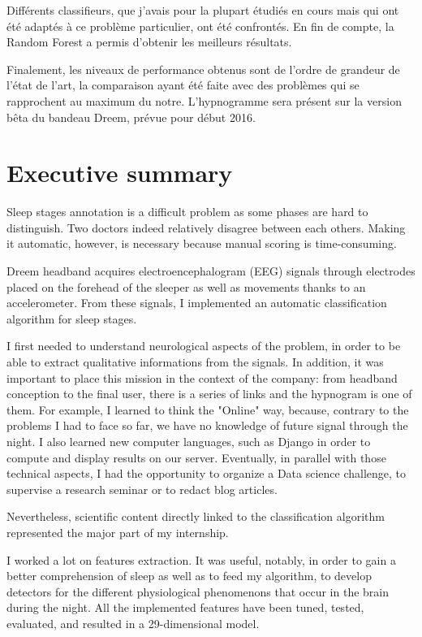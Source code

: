 \documentclass[12pt]{report}
\begin{document}
Différents classifieurs, que j'avais pour la plupart étudiés en cours mais qui ont été adaptés à ce problème particulier, ont été confrontés. En fin de compte, la Random Forest a permis d'obtenir les meilleurs résultats.

Finalement, les niveaux de performance obtenus sont de l'ordre de grandeur de l'état de l'art, la comparaison ayant été faite avec des problèmes qui se rapprochent au maximum du notre. L'hypnogramme sera présent sur la version bêta du bandeau Dreem, prévue pour début 2016.

\newpage
\section*{Executive summary}

Sleep stages annotation is a difficult problem as some phases are hard to distinguish. Two doctors indeed relatively disagree between each others. Making it automatic, however, is necessary because manual scoring is time-consuming.

Dreem headband acquires electroencephalogram (EEG) signals through electrodes placed on the forehead of the sleeper as well as movements thanks to an accelerometer. From these signals, I implemented an automatic classification algorithm for sleep stages.

I first needed to understand neurological aspects of the problem, in order to be able to extract qualitative informations from the signals. In addition, it was important to place this mission in the context of the company: from headband conception to the final user, there is a series of links and the hypnogram is one of them. For example, I learned to think the "Online" way, because, contrary to the problems I had to face so far, we have no knowledge of future signal through the night. I also learned new computer languages, such as Django in order to compute and display results on our server. Eventually, in parallel with those technical aspects, I had the opportunity to organize a Data science challenge, to supervise a research seminar or to redact blog articles.

Nevertheless, scientific content directly linked to the classification algorithm represented the major part of my internship.

I worked a lot on features extraction. It was useful, notably, in order to gain a better comprehension of sleep as well as to feed my algorithm, to develop detectors for the different physiological phenomenons that occur in the brain during the night. All the implemented features have been tuned, tested, evaluated, and resulted in a 29-dimensional model.
\end{document}

